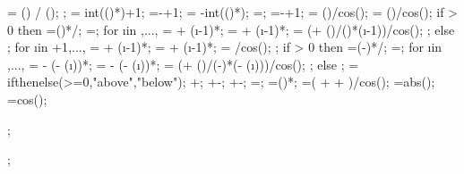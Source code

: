 {{		\arrlenratioright = (\midratioright) / (\arrforceratio);
		;
		\leftendarrno = int(()*\arrlenratioleft)+1;
		\nleftarrows=\leftendarrno-\leftstartarrno+1;
		\rightstartarrno = \loadarrownumber-int(()*\arrlenratioright);
		\rightendarrno=\loadarrownumbermo;
		\nrightarrows=\rightendarrno-\rightstartarrno+1;
		 = (\loadarrowheightleft)/cos(\extraangle);
		\loadarrowheight{\loadarrownumber} = (\loadarrowheightright)/cos(\extraangle);
		if \nleftarrows > 0 then {
			\leftendarrratio=()*\loadwxvalue/\loaddxaleft;
			\dahleftend=\leftendarrratio*\dahleft;
			for \i in {\leftstartarrno,...,{\leftendarrno}}{
				\loadxvalue{\i} =  + (\i-1)*\loadwxvalue;
				\loadyvalue{\i} =  + (\i-1)*\loadwyvalue;
				\loadarrowheight{\i} = (\loadarrowheightleft + (\dahleftend)/()*(\i-1))/cos(\extraangle);
			};} else {};
		for \i in {{\leftendarrno+1},...,{}}{
			\loadxvalue{\i} =  + (\i-1)*\loadwxvalue;
			\loadyvalue{\i} =  + (\i-1)*\loadwyvalue;
			\loadarrowheight{\i} = \loadarrowheightmid/cos(\extraangle);
		};
		if \nrightarrows > 0 then {
			\rightstartarrratio=(\loadarrownumber-\rightstartarrno)*\loadwxvalue/\loaddxaright;
			\dahrightstart=\rightstartarrratio*\dahright;
			for \i in {{\rightendarrno},...,{\rightstartarrno}}{
				\loadxvalue{\i} = \loadxvalue{\loadarrownumber} - (\loadarrownumber - (\i))*\loadwxvalue;
				\loadyvalue{\i} = \loadyvalue{\loadarrownumber} - (\loadarrownumber - (\i))*\loadwyvalue;
				\loadarrowheight{\i} = (\loadarrowheightright + (\dahrightstart)/(\loadarrownumber-\rightstartarrno)*(\loadarrownumber - (\i)))/cos(\extraangle);
			};} else {};
		\loc = ifthenelse(\loadarrowheightleft>=0,"above","below");
		+\loadangle;
		+\loadangle-\extraangle;
		+\loadangle-\extraangle;
		\ninetya=\ninetyfac*\ninetydim;
		\ninetyb=()*\ninetydim;
		\totanglen=(\loadarrowheight{\drawanglei} + \angsp + \anglen)/cos(\extraangle);
		\absextraangle=abs(\extraangle);
		\cosextang=cos(\extraangle);
	}
	
	;
	
	;
	
}
